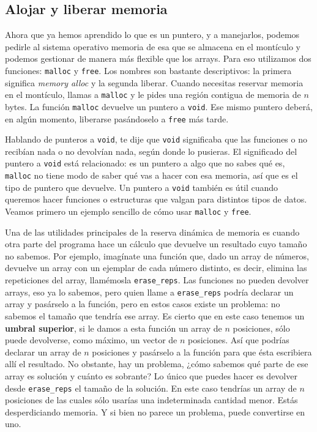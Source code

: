 \documentclass[a4paper]{article}
\begin{document}
\subsection{Alojar y liberar memoria}
Ahora que ya hemos aprendido lo que es un puntero, y a manejarlos, podemos
pedirle al sistema operativo memoria de esa que se almacena en el montículo y
podemos gestionar de manera más flexible que los arrays. Para eso utilizamos
dos funciones: \verb!malloc! y \verb!free!. Los nombres son bastante
descriptivos: la primera significa \textit{memory alloc} y la segunda liberar.
Cuando necesitas reservar memoria en el montículo, llamas a \verb!malloc!
y le pides una región contigua de memoria de $n$ bytes. La función \verb!malloc!
devuelve un puntero a \verb!void!. Ese mismo puntero deberá, en algún momento,
liberarse pasándoselo a \verb!free! más tarde.


Hablando de punteros a \verb!void!, te dije que \verb!void! significaba que
las funciones o no recibían nada o no devolvían nada, según donde lo pusieras.
El significado del puntero a \verb!void! está relacionado: es un puntero a algo
que no sabes qué es, \verb!malloc! no tiene modo de saber qué vas a hacer con
esa memoria, así que es el tipo de puntero que devuelve. Un puntero a
\verb!void! también es útil cuando queremos hacer funciones o estructuras que
valgan para distintos tipos de datos. Veamos primero un ejemplo sencillo de
cómo usar \verb!malloc! y \verb!free!.

Una de las utilidades principales de la reserva dinámica de memoria es cuando
otra parte del programa hace un cálculo que devuelve un resultado cuyo tamaño
no sabemos. Por ejemplo, imagínate una función que, dado un array de números,
devuelve un array con un ejemplar de cada número distinto, es decir, elimina
las repeticiones del array, llamémosla \verb!erase_reps!.
Las funciones no pueden devolver arrays,
eso ya lo sabemos, pero quien llame a \verb!erase_reps! podría declarar un array
y pasárselo a la función, pero en estos casos existe un problema: no sabemos
el tamaño que tendría ese array. Es cierto que en este caso tenemos un
\textbf{umbral superior}, si le damos a esta función un array de $n$ posiciones,
sólo puede devolverse, como máximo, un vector de $n$ posiciones. Así que podrías
declarar un array de $n$ posiciones y pasárselo a la función para que ésta
escribiera allí el resultado. No obstante, hay un problema, ¿cómo sabemos qué
parte de ese array es solución y cuánto es sobrante? Lo único que puedes hacer es
devolver desde \verb!erase_reps! el tamaño de la solución. En este caso tendrías
un array de $n$ posiciones de las cuales sólo usarías una indeterminada cantidad
menor. Estás desperdiciando memoria. Y si bien no parece un problema,
puede convertirse en uno.
\end{document}
